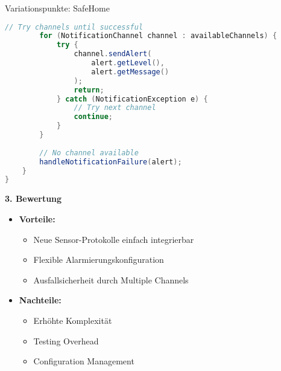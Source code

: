 \begin{example2}{Variationspunkte: SafeHome}
\begin{lstlisting}[language=Java, style=basesmol]
        // Try channels until successful
        for (NotificationChannel channel : availableChannels) {
            try {
                channel.sendAlert(
                    alert.getLevel(), 
                    alert.getMessage()
                );
                return;
            } catch (NotificationException e) {
                // Try next channel
                continue;
            }
        }
        
        // No channel available
        handleNotificationFailure(alert);
    }
}
\end{lstlisting}

\textbf{3. Bewertung}
\begin{itemize}
    \item \textbf{Vorteile:}
    \begin{itemize}
        \item Neue Sensor-Protokolle einfach integrierbar
        \item Flexible Alarmierungskonfiguration
        \item Ausfallsicherheit durch Multiple Channels
    \end{itemize}
    
    \item \textbf{Nachteile:}
    \begin{itemize}
        \item Erhöhte Komplexität
        \item Testing Overhead
        \item Configuration Management
    \end{itemize}
\end{itemize}
\end{example2}